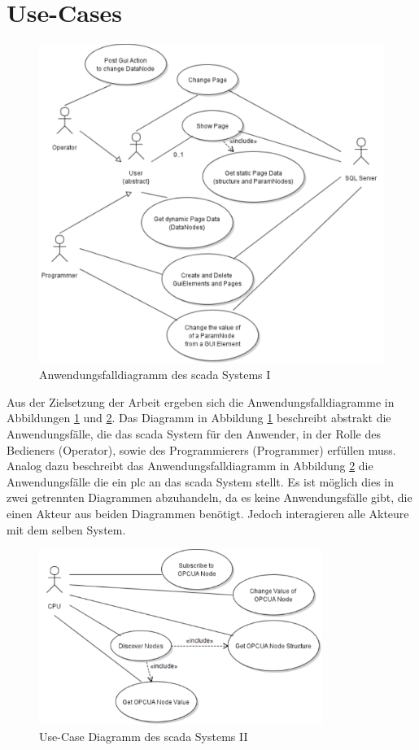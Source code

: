 \section{Use-Cases}
\begin{figure}[ht]
  \centering
  \includegraphics[width=\textwidth]{content/hauptteil/systemEntwurf/res/useCase/I.pdf}
  \caption[Anwendungsfalldiagramm des \acs{scada} Systems I]{Anwendungsfalldiagramm des \acs{scada} Systems I}
  \label{fig:UCI}
\end{figure}
Aus der Zielsetzung der Arbeit ergeben sich die Anwendungsfalldiagramme in Abbildungen \ref{fig:UCI} und \ref{fig:UCII}.
Das Diagramm in Abbildung \ref{fig:UCI} beschreibt abstrakt die Anwendungsfälle, die das \ac{scada} System für den Anwender, in der Rolle des Bedieners (Operator), 
sowie des Programmierers (Programmer) erfüllen muss.
Analog dazu beschreibt das Anwendungsfalldiagramm in Abbildung \ref{fig:UCII} die Anwendungsfälle die ein \ac{plc} an das \ac{scada} System stellt.
Es ist möglich dies in zwei getrennten Diagrammen abzuhandeln, da es keine Anwendungsfälle gibt, die einen Akteur aus beiden Diagrammen benötigt.
Jedoch interagieren alle Akteure mit dem selben System.

\begin{figure}[ht]
  \centering
  \includegraphics[width=0.82\textwidth]{content/hauptteil/systemEntwurf/res/useCase/II.pdf}
  \caption[Use-Case Diagramm des \acs{scada} Systems II]{Use-Case Diagramm des \acs{scada} Systems II}
  \label{fig:UCII}
\end{figure}

